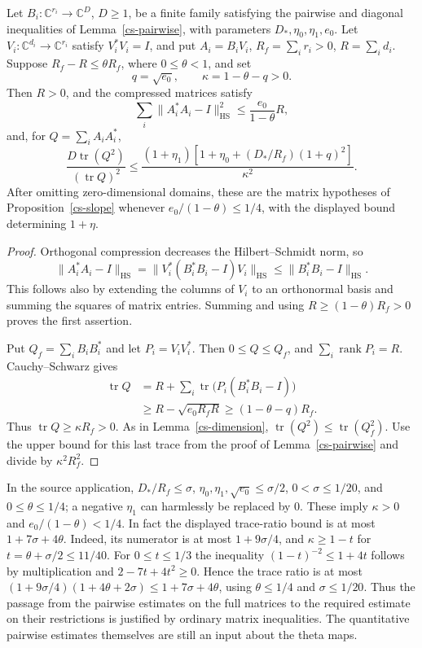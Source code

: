 \begin{lemma}\label{cs-compression}
Let $B_i:\mathbb C^{r_i}\to\mathbb C^D$, $D\ge1$, be a finite family satisfying the pairwise and
diagonal inequalities of Lemma~\ref{cs-pairwise}, with parameters
$D_*,\eta_0,\eta_1,e_0$. Let
$V_i:\mathbb C^{d_i}\to\mathbb C^{r_i}$ satisfy $V_i^*V_i=I$,
and put $A_i=B_iV_i$, $R_f=\sum_i r_i>0$, $R=\sum_i d_i$.
Suppose $R_f-R\le\theta R_f$, where $0\le\theta<1$, and set
\[
 q=\sqrt{e_0},\qquad
 \kappa=1-\theta-q>0.
\]
Then $R>0$, and the compressed matrices satisfy
\[
 \sum_i\|A_i^*A_i-I\|_{\mathrm{HS}}^2
       \le\frac{e_0}{1-\theta}R,
\]
and, for $Q=\sum_iA_iA_i^*$,
\[
 \frac{D\operatorname{tr}(Q^2)}{(\operatorname{tr}Q)^2}
 \le\frac{(1+\eta_1)
 [1+\eta_0+(D_*/R_f)(1+q)^2]}{\kappa^2}.
\]
After omitting zero-dimensional domains, these are the matrix hypotheses
of Proposition~\ref{cs-slope} whenever
$e_0/(1-\theta)\le1/4$, with the displayed bound determining $1+\eta$.
\end{lemma}
\begin{proof}
Orthogonal compression decreases the Hilbert--Schmidt norm, so
\[
 \|A_i^*A_i-I\|_{\mathrm{HS}}
 =\|V_i^*(B_i^*B_i-I)V_i\|_{\mathrm{HS}}
 \le\|B_i^*B_i-I\|_{\mathrm{HS}}.
\]
This follows also by extending the columns of $V_i$ to an orthonormal
basis and summing the squares of matrix entries. Summing and using
$R\ge(1-\theta)R_f>0$ proves the first assertion.

Put $Q_f=\sum_iB_iB_i^*$ and let $P_i=V_iV_i^*$.
Then $0\le Q\le Q_f$, and $\sum_i\operatorname{rank}P_i=R$.
Cauchy--Schwarz gives
\begin{align*}
 \operatorname{tr}Q
 &=R+\sum_i\operatorname{tr}\bigl(P_i(B_i^*B_i-I)\bigr)\\
 &\ge R-\sqrt{e_0R_fR}\ge(1-\theta-q)R_f.
\end{align*}
Thus $\operatorname{tr}Q\ge\kappa R_f>0$.
As in Lemma~\ref{cs-dimension},
$\operatorname{tr}(Q^2)\le\operatorname{tr}(Q_f^2)$.
Use the upper bound for this last trace from the proof of
Lemma~\ref{cs-pairwise} and divide by $\kappa^2R_f^2$.
\end{proof}

In the source application, $D_*/R_f\le\sigma$,
$\eta_0,\eta_1,\sqrt{e_0}\le\sigma/2$, $0<\sigma\le1/20$,
and $0\le\theta\le1/4$; a negative $\eta_1$ can harmlessly be replaced
by $0$. These imply $\kappa>0$ and $e_0/(1-\theta)<1/4$.
In fact the displayed trace-ratio bound is at most $1+7\sigma+4\theta$.
Indeed, its numerator is at most $1+9\sigma/4$, and
$\kappa\ge1-t$ for $t=\theta+\sigma/2\le11/40$.
For $0\le t\le1/3$ the inequality $(1-t)^{-2}\le1+4t$ follows by
multiplication and $2-7t+4t^2\ge0$. Hence the trace ratio is at most
$(1+9\sigma/4)(1+4\theta+2\sigma)
\le1+7\sigma+4\theta$, using $\theta\le1/4$ and $\sigma\le1/20$.
Thus the passage from the pairwise estimates
on the full matrices to the required estimate on their restrictions
is justified by ordinary matrix inequalities. The quantitative
pairwise estimates themselves are still an input about the theta maps.

